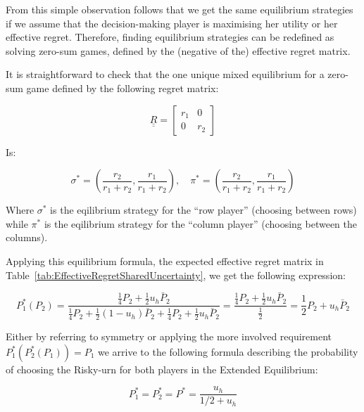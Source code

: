 \documentclass{article}
\theoremstyle{definition}
\begin{document}
From this simple observation follows that we get the same equilibrium strategies if we assume that the decision-making player is maximising her utility or her effective regret.
Therefore, finding equilibrium strategies can be redefined as solving zero-sum games, defined by the (negative of the) effective regret matrix.

It is straightforward to check that the one unique mixed equilibrium for a zero-sum game defined by the following regret matrix:

\begin{equation}
    \underline{\underline{R}}
    =
    \begin{bmatrix}
    r_1 & 0 \\
    0 & r_2 
    \end{bmatrix}
\end{equation}

Is:

\begin{equation}
    \sigma^* = \left ( \frac{r_2}{r_1+r_2}, \frac{r_1}{r_1+r_2} \right )
    , \quad
    \pi^* = \left ( \frac{r_2}{r_1+r_2}, \frac{r_1}{r_1+r_2} \right )
\end{equation}

Where $\sigma^*$ is the eqilibrium strategy for the ``row player'' (choosing between rows) while $\pi^*$  is the eqilibrium strategy for the ``column player'' (choosing between the columns).

Applying this equilibrium formula, the expected effective regret matrix in Table~\ref{tab:EffectiveRegretSharedUncertainty}, we get the following expression:

\begin{equation}
    P_1^*(P_2) = \frac{\frac{1}{4} P_2 + \frac{1}{2} u_h \bar{P}_2}{\frac{1}{4} P_2 + \frac{1}{2}(1-u_h) \bar{P}_2 +\frac{1}{4} P_2 + \frac{1}{2} u_h \bar{P}_2}
    =
     \frac{\frac{1}{4} P_2 + \frac{1}{2} u_h \bar{P}_2}{\frac{1}{2} }
     =
     \frac{1}{2} P_2 + u_h \bar{P}_2
\end{equation}

Either by referring to symmetry or applying the more involved requirement $P^*_1(P^*_2(P_1))=P_1$ we arrive to the following formula describing the probability of choosing the Risky-urn for both players in the Extended Equilibrium:

\begin{equation}
    \boxed{
    P^*_1=P^*_2=P^*=\frac{u_h}{1/2+u_h}
    }
\end{equation}
\end{document}
